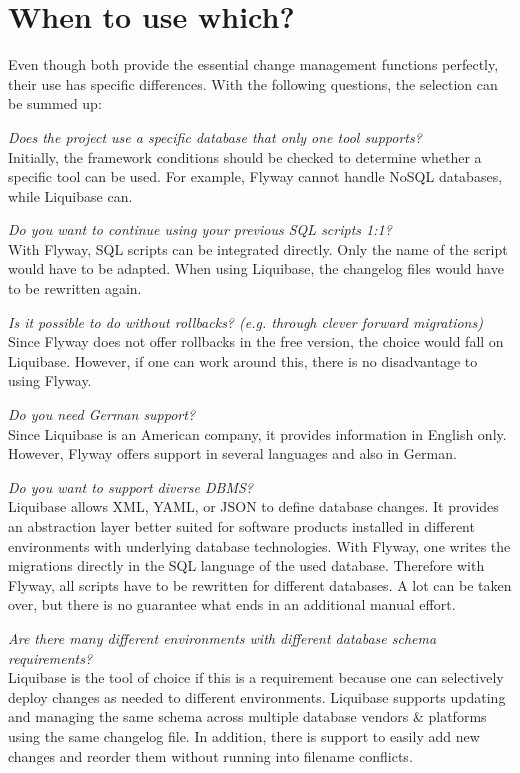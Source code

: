 \newpage
\section{When to use which?}

%
Even though both provide the essential change management functions perfectly,
their use has specific differences. With the following questions, the selection can be summed up:

\textit{Does the project use a specific database that only one tool supports?}\\
Initially, the framework conditions should be checked to determine whether a specific tool can be used. For example, Flyway cannot handle NoSQL databases, while Liquibase can. 

\textit{Do you want to continue using your previous SQL scripts 1:1?}\\
With Flyway, SQL scripts can be integrated directly. Only the name of the script would have to be adapted. When using Liquibase, the changelog files would have to be rewritten again.

\textit{Is it possible to do without rollbacks? (e.g. through clever forward migrations)}\\
Since Flyway does not offer rollbacks in the free version, the choice would fall on Liquibase. However, if one can work around this, there is no disadvantage to using Flyway.

\textit{Do you need German support?}\\
Since Liquibase is an American company, it provides information in English only. However, Flyway offers support in several languages and also in German.

\textit{Do you want to support diverse DBMS?}\\
Liquibase allows XML, YAML, or JSON to define database changes. It provides an abstraction layer better suited for software products installed in different environments with underlying database technologies. With Flyway, one writes the migrations directly in the SQL language of the used database. Therefore with Flyway, all scripts have to be rewritten for different databases. A lot can be taken over, but there is no guarantee what ends in an additional manual effort.

\textit{Are there many different environments with different database schema requirements?}\\
Liquibase is the tool of choice if this is a requirement because one can selectively deploy changes as needed to different environments. 
Liquibase supports updating and managing the same schema across multiple database vendors \& platforms using the same changelog file.
In addition, there is support to easily add new changes and reorder them without running into filename conflicts.


\newpage